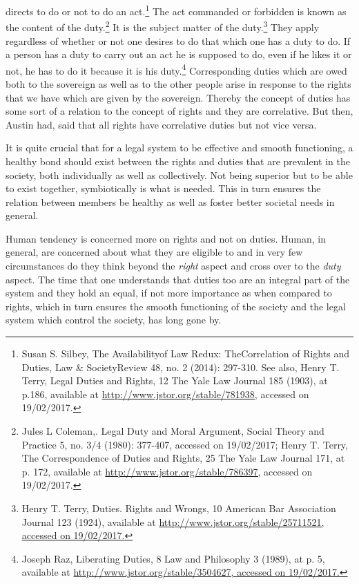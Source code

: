 \begin{multicols}{2}
directs to do or not to do an act.\footnote{Susan S. Silbey, The Availabilityof Law Redux: TheCorrelation of Rights and Duties, Law \& SocietyReview 48, no. 2 (2014): 297-310. See also, Henry T. Terry, Legal Duties and Rights, 12 The Yale Law Journal 185 (1903), at p.186, available at \url{http://www.jstor.org/stable/781938,} accessed on 19/02/2017.} The act commanded or forbidden is known as the content of
the duty.\footnote{Jules L Coleman,. Legal Duty and Moral Argument, Social Theory and Practice 5, no. 3/4 (1980): 377-407, accessed on 19/02/2017; Henry T. Terry, The Correspondence of Duties and Rights, 25 The Yale Law Journal 171, at p. 172, available at \url{http://www.jstor.org/stable/786397,} accessed on 19/02/2017.} It is the subject matter of the duty.\footnote{Henry T. Terry, Duties. Rights and Wrongs, 10 American Bar Association Journal 123 (1924), available at  \url{http://www.jstor.org/stable/25711521, accessed on 19/02/2017.}} They apply regardless of whether or not one desires to do that which one has a duty to do. If a person has a duty to carry out an act he is supposed to do, even if he likes it or not, he has to do it because it is his duty.\footnote{Joseph Raz, Liberating Duties, 8 Law and Philosophy 3 (1989), at p. 5, available at  \url{http://www.jstor.org/stable/3504627, accessed on 19/02/2017.}} Corresponding duties which are owed both to the sovereign as well as to the other people arise in response to the rights that we have which are given by the sovereign. Thereby the concept of duties has
some sort of a relation to the concept of rights and they are correlative. But then, Austin had,
said that all rights have correlative duties but not vice versa.

\noi
It is quite crucial that for a legal system to be effective and smooth functioning, a healthy bond
should exist between the rights and duties that are prevalent in the society, both individually as
well as collectively. Not being superior but to be able to exist together, symbiotically is what
is needed. This in turn ensures the relation between members be healthy as well as foster better
societal needs in general.

\noi
Human tendency is concerned more on rights and not on duties. Human, in general, are
concerned about what they are eligible to and in very few circumstances do they think beyond
the \textit{right} aspect and cross over to the \textit{duty} aspect. The time that one understands that duties too
are an integral part of the system and they hold an equal, if not more importance as when
compared to rights, which in turn ensures the smooth functioning of the society and the legal
system which control the society, has long gone by.


\end{multicols}
